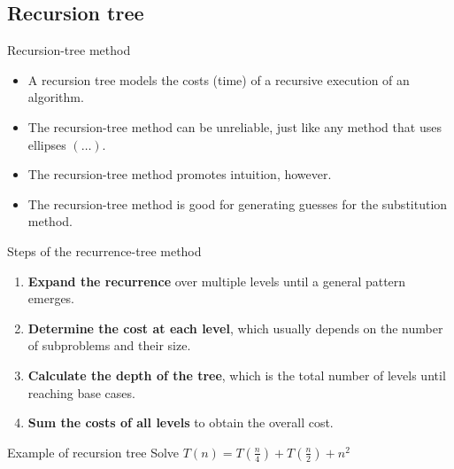 \documentclass{beamer}
\begin{document}
\subsection{Recursion tree}

\begin{frame}{Recursion-tree method}
    \begin{itemize}
        \item A recursion tree models the costs (time) of a recursive execution of an algorithm.
        \item The recursion-tree method can be unreliable, just like any method that uses ellipses $(\ldots)$.
        \item The recursion-tree method promotes intuition, however.
        \item The recursion-tree method is good for generating guesses for the substitution method.
    \end{itemize}
\end{frame}

\begin{frame}{Steps of the recurrence-tree method}
    \begin{enumerate}
        \item \textbf{Expand the recurrence} over multiple levels until a general pattern emerges.
        \item \textbf{Determine the cost at each level}, which usually depends on the number of subproblems and their size.
        \item \textbf{Calculate the depth of the tree}, which is the total number of levels until reaching base cases.
        \item \textbf{Sum the costs of all levels} to obtain the overall cost.
    \end{enumerate}
\end{frame}

\begin{frame}{Example of recursion tree}
    Solve $T(n) = T\left(\frac{n}{4}\right) + T\left(\frac{n}{2}\right) + n^2$
    \vspace{5.45cm}
\end{frame}
\end{document}
